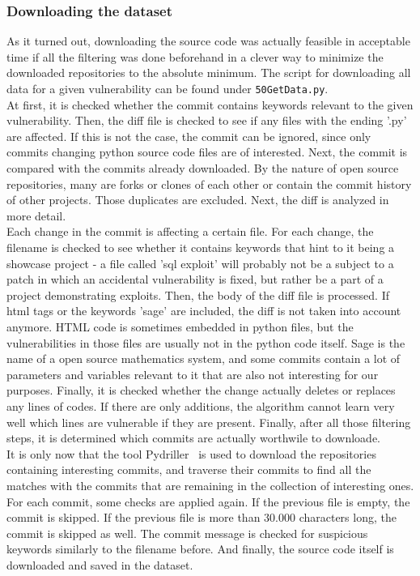 \documentclass[
	a4paper,
	pagesize,
	pdftex,
	12pt,
	twoside, %
	BCOR=5mm, %
	ngerman,
	fleqn,
	final,
	]{scrartcl}
\begin{document}
\subsubsection{Downloading the dataset}

As it turned out, downloading the source code was actually feasible in acceptable time if all the filtering was done beforehand in a clever way to minimize the downloaded repositories to the absolute minimum. The script for downloading all data for a given vulnerability can be found under \texttt{50GetData.py}.\\
At first, it is checked whether the commit contains keywords relevant to the given vulnerability. Then, the diff file is checked to see if any files with the ending '.py' are affected. If this is not the case, the commit can be ignored, since only commits changing python source code files are of interested. Next, the commit is compared with the commits already downloaded. By the nature of open source repositories, many are forks or clones of each other or contain the commit history of other projects. Those duplicates are excluded. Next, the diff is analyzed in more detail.\\
Each change in the commit is affecting a certain file. For each change, the filename is checked to see whether it contains keywords that hint to it being a showcase project - a file called 'sql exploit' will probably not be a subject to a patch in which an accidental vulnerability is fixed, but rather be a part of a project demonstrating exploits. Then, the body of the diff file is processed. If html tags or the keywords 'sage' are included, the diff is not taken into account anymore. HTML code is sometimes embedded in python files, but the vulnerabilities in those files are usually not in the python code itself. Sage is the name of a open source mathematics system, and some commits contain a lot of parameters and variables relevant to it that are also not interesting for our purposes. Finally, it is checked whether the change actually deletes or replaces any lines of codes. If there are only additions, the algorithm cannot learn very well which lines are vulnerable if they are present. Finally, after all those filtering steps, it is determined which commits are actually worthwile to downloade.\\
It is only now that the tool Pydriller~\cite{Spadini.2018} is used to download the repositories containing interesting commits, and traverse their commits to find all the matches with the commits that are remaining in the collection of interesting ones. For each commit, some checks are applied again. If the previous file is empty, the commit is skipped. If the previous file is more than 30.000 characters long, the commit is skipped as well. The commit message is checked for suspicious keywords similarly to the filename before. And finally, the source code itself is downloaded and saved in the dataset. 
\end{document}
